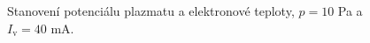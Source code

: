 \documentclass[a4paper,12pt]{article}
\begin{document}
\newpage
\begin{figure}[h!]
	\centering
	\begin{subfigure}[b]{.49\textwidth}
		\centering
	\end{subfigure}
	\begin{subfigure}[b]{.49\textwidth}
		\centering
	\end{subfigure}
	\caption{Stanovení potenciálu plazmatu a elektronové teploty, $p = 10$ \si{\pascal} a $I_\text{v} = 40$ \si{\milli\ampere}.}
	\label{data6}
\end{figure}
\end{document}
